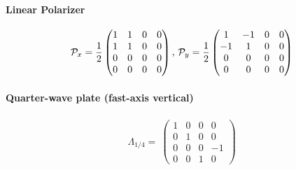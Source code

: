 \paragraph{Linear Polarizer}
\begin{align}
\mathcal{P}_x=\frac{1}{2}
\begin{pmatrix}
    1 & 1 & 0 & 0 \\
    1 & 1 & 0 & 0 \\
    0 & 0 & 0 & 0 \\
    0 & 0 & 0 & 0
  \end{pmatrix}
, \,
\mathcal{P}_y=\frac{1}{2}
\begin{pmatrix}
     1 & -1 & 0 & 0 \\
    -1 &  1 & 0 & 0 \\
     0 &  0 & 0 & 0 \\
     0 &  0 & 0 & 0
\end{pmatrix}
\end{align}
% 
% 
\paragraph{Quarter-wave plate (fast-axis vertical)}
\begin{align}
\Lambda_{1/4}=\
\begin{pmatrix}
    1 & 0 & 0 &  0 \\
    0 & 1 & 0 &  0 \\
    0 & 0 & 0 & -1 \\
    0 & 0 & 1 &  0
\end{pmatrix}
\end{align}
% 
